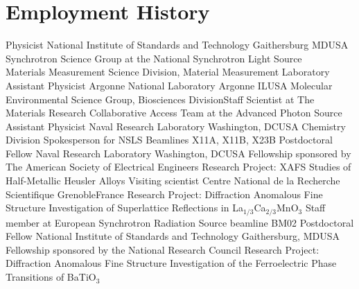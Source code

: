 \documentclass[11pt]{moderncv}
\begin{document}
\maketitle

\section{Employment History}
%
        {Physicist}%
        {\small National Institute of Standards and Technology}%
        {\small Gaithersburg MD}{USA}%
        {Synchrotron Science Group at the National Synchrotron Light Source\\
          Materials Measurement Science Division,
          Material Measurement Laboratory
        }
%
        {Assistant Physicist}%
        {\small Argonne National Laboratory}
        {\small Argonne IL}{USA}%
        {Molecular Environmental Science Group,
          Biosciences Division\newline{}Staff Scientist at The Materials
          Research Collaborative Access Team at the Advanced Photon
          Source
        }
%
%
        {Assistant Physicist}
        {\small Naval Research Laboratory}
        {\small Washington, DC}{USA}
        {Chemistry Division\newline{}
          Spokesperson for NSLS Beamlines X11A, X11B, X23B
        }
%
        {Postdoctoral Fellow}
        {\small Naval Research Laboratory}
        {\small Washington, DC}{USA}
        {Fellowship sponsored by The American Society of Electrical
          Engineers\newline{}
          Research Project: XAFS Studies of Half-Metallic Heusler Alloys
        }
%
        {Visiting scientist}
        {\small Centre National de la Recherche Scientifique}
        {\small Grenoble}{France}
        { Research Project: Diffraction Anomalous Fine Structure
          Investigation of Superlattice Reflections in
          La$_{1/3}$Ca$_{2/3}$MnO$_3$\newline{} 
          Staff member at European Synchrotron Radiation Source
          beamline BM02 
        }
%
        {Postdoctoral Fellow}
        {\small National Institute of Standards and Technology}
        {\small Gaithersburg, MD}{USA}
        {Fellowship sponsored by the National Research
          Council\newline{} 
          Research Project: Diffraction Anomalous Fine Structure
          Investigation 
          of the Ferroelectric Phase Transitions of BaTiO$_3$
        }
\end{document}
